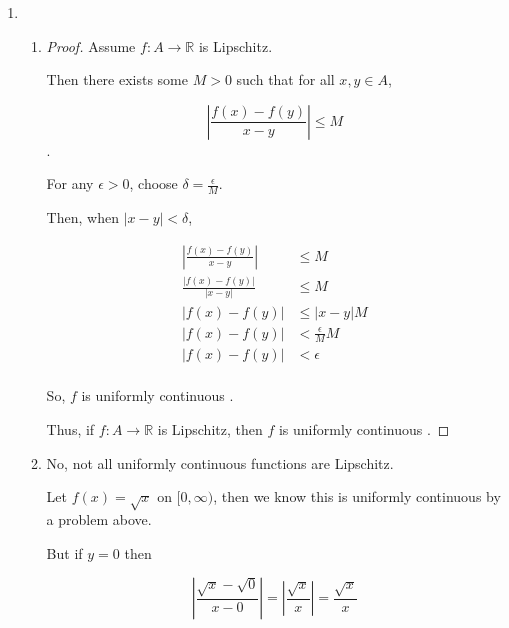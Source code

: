 \documentclass[12pt,letterpaper]{article}
\newcommand\uc{uniformly continuous }
\begin{document}
\begin{enumerate}
\begin{enumerate}
\begin{enumerate}
\begin{proof}
                So $f$ is \uc on $[1, \infty)$.

                From part (a), we conclude that $f$ is \uc on $[0, \infty)$.

                Thus, $f(x) = \sqrt{x}$ \uc on $[0, \infty)$.
              \end{proof}
          \end{enumerate}
        \item
          \begin{enumerate}
            \item
              \begin{proof}
                Assume $f : A \to \mathbb{R}$ is Lipschitz.

                Then there exists some $M > 0$ such that for all $x, y \in A$,

                \[\left|\frac{f(x) - f(y)}{x - y}\right| \leq M\].

                For any $\epsilon > 0$, choose $\delta = \frac{\epsilon}{M}$.

                Then, when $|x - y| < \delta$,

                \begin{align*}
                  \left|\frac{f(x) - f(y)}{x - y}\right| &\leq M \\
                  \frac{\left|f(x) - f(y)\right|}{\left|x - y\right|} &\leq M \\
                  \left|f(x) - f(y)\right| &\leq \left|x - y\right|M \\
                  \left|f(x) - f(y)\right| &< \frac{\epsilon}{M}M \\
                  \left|f(x) - f(y)\right| &< \epsilon \\
                \end{align*}

                So, $f$ is \uc.

                Thus, if $f : A \to \mathbb{R}$ is Lipschitz,
                then $f$ is \uc.
              \end{proof}
            \item
              No, not all \uc functions are Lipschitz.

              Let $f(x) = \sqrt{x}$ on $[0, \infty)$, then we know this is \uc by a problem above.

              But if $y = 0$ then

              \[
                \left|\frac{\sqrt{x} - \sqrt{0}}{x - 0}\right|
                =
                \left|\frac{\sqrt{x}}{x}\right|
                =
                \frac{\sqrt{x}}{x}
              \]


\end{enumerate}
\end{enumerate}
\end{enumerate}
\end{document}
